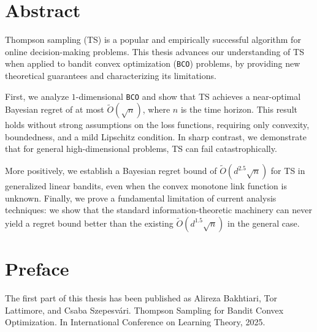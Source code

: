 \documentclass[letter, 12pt]{report}
\newcommand{\1}{\mathbf{1}}
\newcommand{\bco}{\texttt{BCO}\xspace}
\newcommand{\ts}{\textsc{TS}\xspace}
\theoremstyle{plain}
\theoremstyle{definition}
\theoremstyle{remark}
\begin{document}
\setcounter{page}{1}
\renewcommand{\thepage}{\roman{page}} %


\doublespacing

\chapter*{Abstract}
Thompson sampling (\ts) is a popular and empirically successful algorithm for online decision-making problems.
This thesis advances our understanding of \ts when applied to bandit convex optimization (\bco) problems,
by providing new theoretical guarantees and characterizing its limitations.

First, we analyze $1$-dimensional \bco and show that \ts achieves a near-optimal Bayesian regret of at most $\tilde O(\sqrt{n})$, where $n$ is the time horizon.
This result holds without strong assumptions on the loss functions, requiring only convexity, boundedness, and a mild Lipschitz condition.
In sharp contrast, we demonstrate that for general high-dimensional problems, \ts can fail catastrophically.

More positively, we establish a Bayesian regret bound of $\tilde O(d^{2.5} \sqrt{n})$ for \ts in generalized linear bandits, even when the convex monotone link function is unknown.
Finally, we prove a fundamental limitation of current analysis techniques: we show that the standard information-theoretic machinery can never yield a regret bound better than the existing $\tilde O(d^{1.5} \sqrt{n})$ in the general case.

\setcounter{page}{2}
\renewcommand{\thepage}{\roman{page}} %

\onehalfspacing
\chapter*{Preface} 
The first part of this thesis has been published as Alireza Bakhtiari,
Tor Lattimore, and Csaba Szepesv\'ari.
Thompson Sampling for Bandit Convex Optimization.
In International Conference on Learning Theory, 2025.
\end{document}

